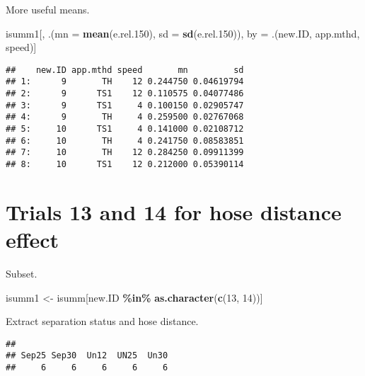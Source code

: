 \documentclass[
]{article}
\newenvironment{Shaded}{\begin{snugshade}}{\end{snugshade}}
\newcommand{\AttributeTok}[1]{\textcolor[rgb]{0.13,0.29,0.53}{#1}}
\newcommand{\DecValTok}[1]{\textcolor[rgb]{0.00,0.00,0.81}{#1}}
\newcommand{\FloatTok}[1]{\textcolor[rgb]{0.00,0.00,0.81}{#1}}
\newcommand{\FunctionTok}[1]{\textcolor[rgb]{0.13,0.29,0.53}{\textbf{#1}}}
\newcommand{\NormalTok}[1]{#1}
\newcommand{\OtherTok}[1]{\textcolor[rgb]{0.56,0.35,0.01}{#1}}
\newcommand{\SpecialCharTok}[1]{\textcolor[rgb]{0.81,0.36,0.00}{\textbf{#1}}}
\begin{document}
More useful means.

\begin{Shaded}
\begin{Highlighting}[]
\NormalTok{isumm1[, .(}\AttributeTok{mn =} \FunctionTok{mean}\NormalTok{(e.rel}\FloatTok{.150}\NormalTok{), }\AttributeTok{sd =} \FunctionTok{sd}\NormalTok{(e.rel}\FloatTok{.150}\NormalTok{)), by }\OtherTok{=}\NormalTok{ .(new.ID, app.mthd, speed)]}
\end{Highlighting}
\end{Shaded}

\begin{verbatim}
##    new.ID app.mthd speed       mn         sd
## 1:      9       TH    12 0.244750 0.04619794
## 2:      9      TS1    12 0.110575 0.04077486
## 3:      9      TS1     4 0.100150 0.02905747
## 4:      9       TH     4 0.259500 0.02767068
## 5:     10      TS1     4 0.141000 0.02108712
## 6:     10       TH     4 0.241750 0.08583851
## 7:     10       TH    12 0.284250 0.09911399
## 8:     10      TS1    12 0.212000 0.05390114
\end{verbatim}

\section{Trials 13 and 14 for hose distance
effect}\label{trials-13-and-14-for-hose-distance-effect}

Subset.

\begin{Shaded}
\begin{Highlighting}[]
\NormalTok{isumm1 }\OtherTok{\textless{}{-}}\NormalTok{ isumm[new.ID }\SpecialCharTok{\%in\%} \FunctionTok{as.character}\NormalTok{(}\FunctionTok{c}\NormalTok{(}\DecValTok{13}\NormalTok{, }\DecValTok{14}\NormalTok{))]}
\end{Highlighting}
\end{Shaded}

Extract separation status and hose distance.

\begin{Shaded}
\end{Shaded}

\begin{verbatim}
## 
## Sep25 Sep30  Un12  UN25  Un30 
##     6     6     6     6     6
\end{verbatim}
\end{document}
